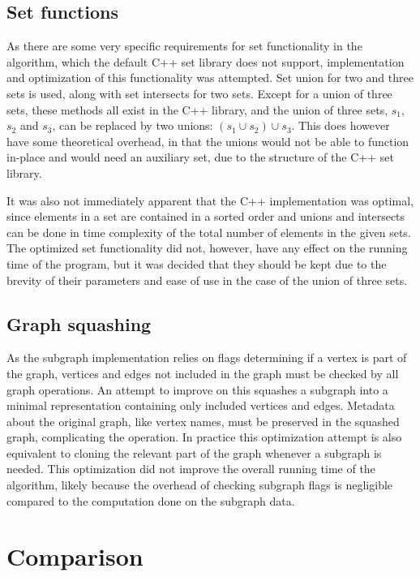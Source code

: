 \documentclass{article}
\begin{document}
		\subsection{Set functions}
		As there are some very specific requirements for set functionality in the algorithm, which the default C++ set library does not support, implementation and optimization of this functionality was attempted.
		Set union for two and three sets is used, along with set intersects for two sets.
		Except for a union of three sets, these methods all exist in the C++ library, and the union of three sets, $s_1$, $s_2$ and $s_3$, can be replaced by two unions: $(s_1 \cup s_2) \cup s_3$.
		This does however have some theoretical overhead, in that the unions would not be able to function in-place and would need an auxiliary set, due to the structure of the C++ set library.

		It was also not immediately apparent that the C++ implementation was optimal, since elements in a set are contained in a sorted order and unions and intersects can be done in time complexity of the total number of elements in the given sets.
		The optimized set functionality did not, however, have any effect on the running time of the program, but it was decided that they should be kept due to the brevity of their parameters and ease of use in the case of the union of three sets.
		
		\subsection{Graph squashing}
		As the subgraph implementation relies on flags determining if a vertex is part of the graph, vertices and edges not included in the graph must be checked by all graph operations.
		An attempt to improve on this squashes a subgraph into a minimal representation containing only included vertices and edges.
		Metadata about the original graph, like vertex names, must be preserved in the squashed graph, complicating the operation.
		In practice this optimization attempt is also equivalent to cloning the relevant part of the graph whenever a subgraph is needed. This optimization did not improve the overall running time of the algorithm, likely because the overhead of checking subgraph flags is negligible compared to the computation done on the subgraph data.

	\section{Comparison}
\end{document}

